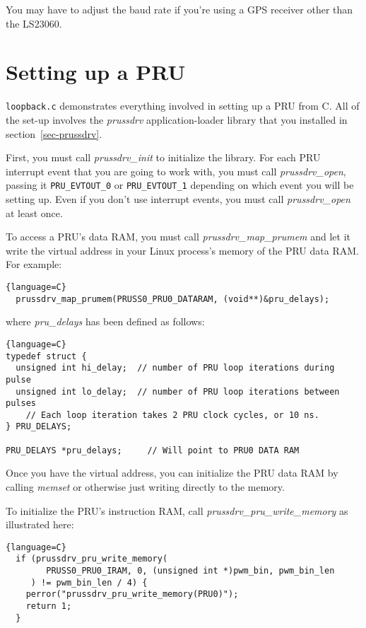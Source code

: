 \documentclass[letterpaper,11pt,fleqn]{article}
\begin{document}
You may have to adjust the baud rate if you're using a GPS receiver other than
the LS23060.

\section{Setting up a PRU} \label{sec-setup}

\texttt{loopback.c} demonstrates everything involved in setting up a PRU from
C. All of the set-up involves the \textit{prussdrv} application-loader
library that you installed in section~\ref{sec-prussdrv}.

First, you must call \textit{prussdrv\_init} to initialize the library.
For each PRU interrupt event that you are going to work with, you must call
\textit{prussdrv\_open}, passing it \texttt{PRU\_EVTOUT\_0} or
\texttt{PRU\_EVTOUT\_1} depending on which event you will be setting up.
Even if you don't use interrupt events, you must call \textit{prussdrv\_open}
at least once.

To access a PRU's data RAM, you must call \textit{prussdrv\_map\_prumem}
and let it write the virtual address in your Linux process's memory
of the PRU data RAM. For example:

\begin{lstlisting}{language=C}
  prussdrv_map_prumem(PRUSS0_PRU0_DATARAM, (void**)&pru_delays);
\end{lstlisting}

\noindent
where \textit{pru\_delays} has been defined as follows:

\begin{lstlisting}{language=C}
typedef struct {
  unsigned int hi_delay;  // number of PRU loop iterations during pulse
  unsigned int lo_delay;  // number of PRU loop iterations between pulses
    // Each loop iteration takes 2 PRU clock cycles, or 10 ns.
} PRU_DELAYS;

PRU_DELAYS *pru_delays;     // Will point to PRU0 DATA RAM
\end{lstlisting}

Once you have the virtual address, you can initialize the PRU data RAM
by calling \textit{memset} or otherwise just writing directly to the memory.

To initialize the PRU's instruction RAM, call
\textit{prussdrv\_pru\_write\_memory} as illustrated here:

\begin{lstlisting}{language=C}
  if (prussdrv_pru_write_memory(
        PRUSS0_PRU0_IRAM, 0, (unsigned int *)pwm_bin, pwm_bin_len
     ) != pwm_bin_len / 4) {
    perror("prussdrv_pru_write_memory(PRU0)");
    return 1;
  }
\end{lstlisting}
\end{document}
